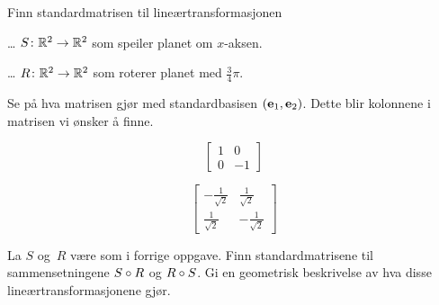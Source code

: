 \begin{oppgave}
Finn standardmatrisen til lineærtransformasjonen
\begin{punkt}
\ldots{} $S \colon \mathbb{R}^2 \to \mathbb{R}^2$ som
speiler planet om $x$-aksen.
\end{punkt}
\begin{punkt}
\ldots{} $R \colon \mathbb{R}^2 \to \mathbb{R}^2$ som
roterer planet med $\frac{3}{4}\pi$.
\end{punkt}
\end{oppgave}

\begin{losning}
Se på hva matrisen gjør med standardbasisen $(\mathbf{e}_1, \mathbf{e}_2)$. Dette blir
kolonnene i matrisen vi ønsker å finne.
\begin{punkt}
\[
\begin{bmatrix}
1 & 0\\
0 & -1
\end{bmatrix}
\]
\end{punkt}

\begin{punkt}
\[
\begin{bmatrix}
-\frac{1}{\sqrt{2}} & \frac{1}{\sqrt{2}} \\
\frac{1}{\sqrt{2}}  & -\frac{1}{\sqrt{2}} 
\end{bmatrix}
\]
\end{punkt}


\end{losning}


\begin{oppgave}
La $S$ og~$R$ være som i forrige oppgave.  Finn standardmatrisene til
sammensetningene $S \circ R$ og $R \circ S$.  Gi en geometrisk
beskrivelse av hva disse lineærtransformasjonene gjør.
\end{oppgave}

